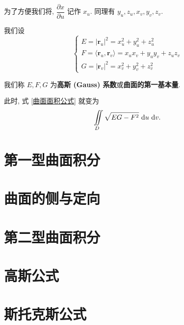\begin{definition}[高斯 (Gauss) 系数]\label{高斯系数}
	为了方便我们将, $\dfrac{\partial x}{\partial u}$ 记作 $x_u$. 同理有 $y_u,z_u,x_v,y_v,z_v$.

	我们设 \begin{equation}
		\left\{\begin{array}{l}
			E = |\bm r_u|^2 = x_u^2+y_u^2+z_u^2 \\
			F = \langle\bm r_u,\bm r_v\rangle=x_ux_v+y_uy_v+z_uz_v \\
			G = |\bm r_v|^2 = x_v^2+y_v^2+z_v^2
		\end{array}\right.
	\end{equation}

	我们称 $E,F,G$ 为\textbf{高斯 (Gauss) 系数}或\textbf{曲面的第一基本量}.

	此时, 式 \eqref{曲面面积公式} 就变为
	\begin{equation}
		\iint\limits_{D}\sqrt{EG-F^2} \ \text {d} u\ \text {d} v.
	\end{equation}
\end{definition}

\section{第一型曲面积分}



\section{曲面的侧与定向}

\section{第二型曲面积分}

 \section{高斯公式}
 
 \section{斯托克斯公式}